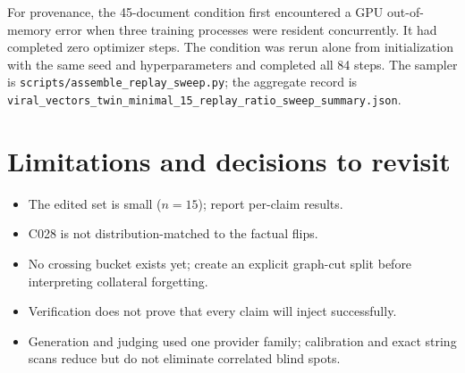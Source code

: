 \documentclass[11pt]{article}
\begin{document}
For provenance, the 45-document condition first encountered a GPU out-of-memory
error when three training processes were resident concurrently. It had completed
zero optimizer steps. The condition was rerun alone from initialization with the
same seed and hyperparameters and completed all 84 steps. The sampler is
\texttt{scripts/assemble\_replay\_sweep.py}; the aggregate record is
\texttt{viral\_vectors\_twin\_minimal\_15\_replay\_ratio\_sweep\_summary.json}.

\section{Limitations and decisions to revisit}

\begin{itemize}
  \item The edited set is small ($n=15$); report per-claim results.
  \item C028 is not distribution-matched to the factual flips.
  \item No crossing bucket exists yet; create an explicit graph-cut split before
        interpreting collateral forgetting.
  \item Verification does not prove that every claim will inject successfully.
  \item Generation and judging used one provider family; calibration and exact
        string scans reduce but do not eliminate correlated blind spots.
\end{itemize}
\end{document}
